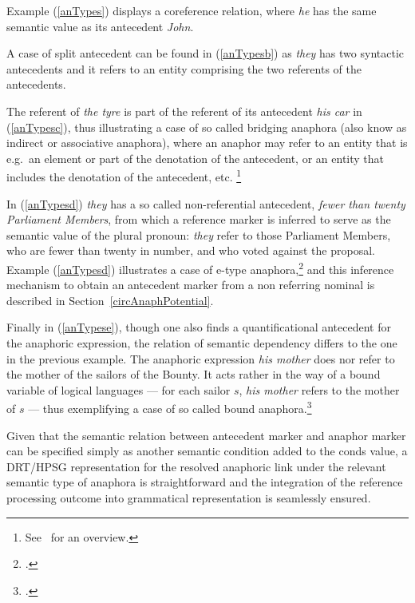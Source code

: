 \documentclass[output=paper
,modfonts
,nonflat]{langsci/langscibook}
\begin{document}
 Example (\ref{anTypes}) displays a coreference relation, where {\it he} has the same semantic value as its antecedent {\it John}. 
 
 A case of split antecedent can be found in (\ref{anTypesb}) as {\it they} has two syntactic antecedents and it refers to an entity comprising the two referents of the antecedents. 
 
 The referent of {\it the tyre} is part of the referent of its antecedent {\it his car} in (\ref{anTypesc}), 
 thus illustrating a case of so called bridging anaphora (also know as indirect or associative anaphora),
where an anaphor may refer to an entity that is e.g.\ an element or part 
of the denotation of the antecedent, or an entity that includes the denotation
of the antecedent, etc.%
\footnote{
See~\citep{poesio:ana98} for an overview.
}
% 

In (\ref{anTypesd}) {\it they} has 
a so called non-referential antecedent, {\it fewer than twenty Parliament Members}, 
from which a reference marker is inferred to serve as the semantic value of the plural pronoun: 
{\it they} refer to those Parliament Members, who are fewer than twenty in number, and who voted against the proposal.
 Example (\ref{anTypesd}) illustrates a case of e-type anaphora,\footnote{
\citep{evans:pron80}.} and this inference mechanism to obtain an antecedent marker
from a non referring nominal is described in Section~\ref{circAnaphPotential}. 

 Finally in (\ref{anTypese}), though one also finds a quantificational antecedent for the anaphoric expression, the relation of semantic dependency differs to the one in the previous example. The anaphoric expression {\it his mother} does nor refer to the mother of the sailors of the Bounty. It acts rather in the way of a bound variable of logical languages --- for each sailor $s$, {\it his mother} refers to the mother of $s$ --- thus exemplifying a case of so called bound anaphora.\footnote{
\citep{reinhart:bound83}.
}


Given that the semantic relation between antecedent marker and anaphor marker 
can be specified simply as another semantic condition added to the
{\sc conds} value, a DRT/HPSG representation for the resolved anaphoric
link under the relevant semantic type of anaphora is straightforward and the integration 
of the reference processing outcome into grammatical representation is seamlessly ensured.
\end{document}
